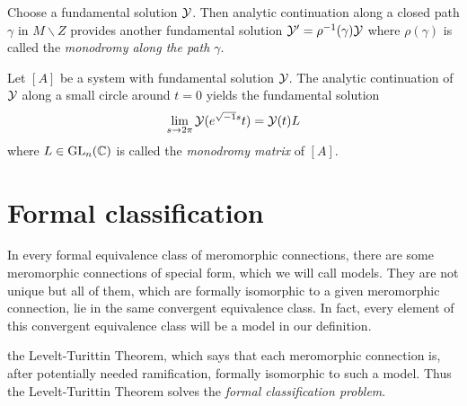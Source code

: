 Choose a fundamental solution $\mathcal{Y}$. Then analytic continuation along a closed
path $\gamma$ in $M\backslash Z$ provides another fundamental solution
$\mathcal{Y}'=\rho^{-1}(\gamma)\mathcal{Y}$ where $\rho(\gamma)$ is called the \emph{monodromy
along the path $\gamma$}.
\begin{defn}
  Let $[A]$ be a system with fundamental solution $\mathcal{Y}$.
  The analytic continuation of $\mathcal{Y}$ along a small circle around $t=0$ yields
  the fundamental solution
  \[
    \lim_{s\to2\pi}\mathcal{Y}(e^{\sqrt{-1}s}t)=\mathcal{Y}(t)L
  \]
  where $L\in\operatorname{GL}_n(\mathbb{C})$ is called the \emph{\TODO[(formal)?]monodromy matrix}
  of $[A]$.
\end{defn}

 

\section{Formal classification}\label{sec:formalClassification}
In every formal equivalence class of meromorphic connections, there are some
meromorphic connections of special form, which we will call models. They are
not unique but all of them, which are formally isomorphic to a given
meromorphic connection, lie in the same convergent equivalence class.
In fact, every element of this convergent equivalence class will be a model in
our definition.

 the Levelt-Turittin Theorem, which says
that each meromorphic connection is, after potentially needed ramification,
formally isomorphic to such a model.
Thus the Levelt-Turittin Theorem solves the \emph{formal classification
problem}.


